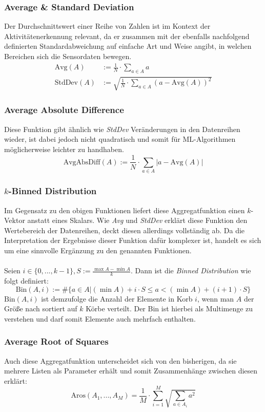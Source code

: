 \subsubsection{Average \& Standard Deviation}
Der Durchschnittswert einer Reihe von Zahlen ist im Kontext der Aktivitätenerkennung relevant, da er zusammen mit der ebenfalls nachfolgend definierten Standardabweichung auf einfache Art und Weise angibt, in welchen Bereichen sich die Sensordaten bewegen.
\vspace{-5pt}
\begin{align*}
	\text{Avg}(A) &:= \frac{1}{N} \cdot \sum_{a \in A} a \\
	\text{StdDev}(A) &:= \sqrt{\frac{1}{N} \cdot \sum_{a \in A} (a - \text{Avg}(A))^2}
\end{align*}
\subsubsection{Average Absolute Difference}
Diese Funktion gibt ähnlich wie \textit{StdDev} Veränderungen in den Datenreihen wieder, ist dabei jedoch nicht quadratisch und somit für ML-Algorithmen möglicherweise leichter zu handhaben.
\[
\text{AvgAbsDiff}(A) := \frac{1}{N} \cdot \sum_{a \in A} |a - \text{Avg}(A)|
\]
\subsubsection{$k$-Binned Distribution}
Im Gegensatz zu den obigen Funktionen liefert diese Aggregatfunktion einen $k$-Vektor anstatt eines Skalars. Wie \textit{Avg} und \textit{StdDev} erklärt diese Funktion den Wertebereich der Datenreihen, deckt diesen allerdings vollständig ab. Da die Interpretation der Ergebnisse dieser Funktion dafür komplexer ist, handelt es sich um eine sinnvolle Ergänzung zu den genannten Funktionen.
\\\\
Seien $i \in \{0, ..., k - 1\}, S := \frac{\max A - \min A}{k}$. Dann ist die \textit{Binned Distribution} wie folgt definiert:
\[
\text{Bin}(A, i) := \#\{a \in A | (\min A) + i \cdot S \leq a < (\min A) + (i + 1) \cdot S\}
\]
$\text{Bin}(A, i)$ ist demzufolge die Anzahl der Elemente in Korb $i$, wenn man $A$ der Größe nach sortiert auf $k$ Körbe verteilt. Der Bin ist hierbei als Multimenge zu verstehen und darf somit Elemente auch mehrfach enthalten.
\subsubsection{Average Root of Squares}
Auch diese Aggregatfunktion unterscheidet sich von den bisherigen, da sie mehrere Listen als Parameter erhält und somit Zusammenhänge zwischen diesen erklärt:
\[
\text{Aros}(A_1, ..., A_M) = \frac{1}{M} \cdot \sum_{i = 1}^{M} \sqrt{\sum_{a \in A_i} a^2}
\]
